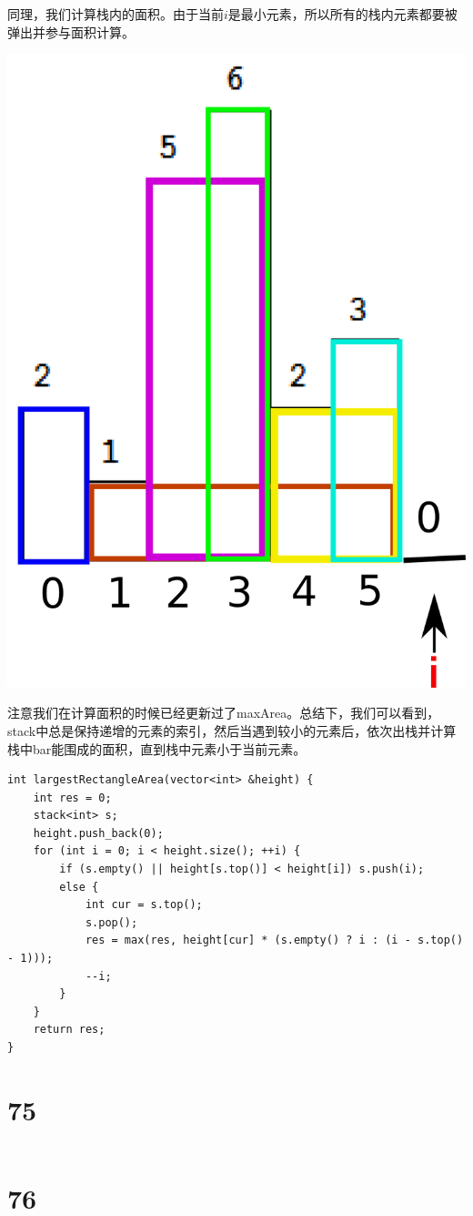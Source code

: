 \documentclass[12pt,a4paper]{article}
\begin{document}
\begin{CJK}{UTF8}{gbsn}
同理，我们计算栈内的面积。由于当前$i$是最小元素，所以所有的栈内元素都要被弹出并参与面积计算。
\end{CJK}
\begin{center}
\includegraphics[width=0.5\linewidth]{008407.png}
\end{center}
\begin{CJK}{UTF8}{gbsn}
注意我们在计算面积的时候已经更新过了maxArea。总结下，我们可以看到，stack中总是保持递增的元素的索引，然后当遇到较小的元素后，依次出栈并计算栈中bar能围成的面积，直到栈中元素小于当前元素。
\end{CJK}
\begin{lstlisting}
int largestRectangleArea(vector<int> &height) {
	int res = 0;
	stack<int> s;
	height.push_back(0);
	for (int i = 0; i < height.size(); ++i) {
		if (s.empty() || height[s.top()] < height[i]) s.push(i);
		else {
			int cur = s.top();
			s.pop();
			res = max(res, height[cur] * (s.empty() ? i : (i - s.top() - 1)));
			--i;
		}
	}
	return res;
}
\end{lstlisting}


\section{75}
\begin{CJK}{UTF8}{gbsn}
\end{CJK}
\begin{lstlisting}
\end{lstlisting}

\section{76}
\begin{CJK}{UTF8}{gbsn}\end{CJK}
\begin{lstlisting}
\end{lstlisting}
\end{document}
